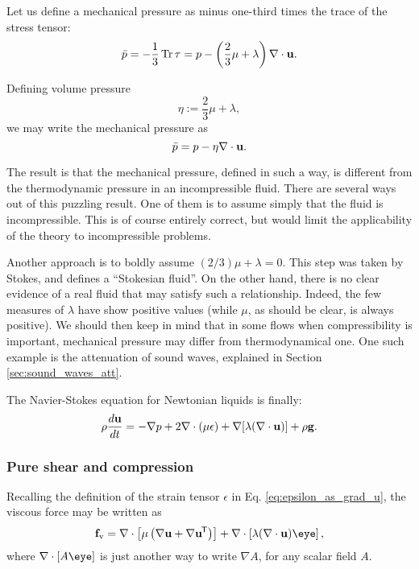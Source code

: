 Let us define a mechanical pressure as minus one-third times the trace
of the stress tensor:
\[
\bar{p}=
-\frac13 \operatorname{Tr} \tau  = 
 p
- \left( \frac23 \mu  + \lambda \right) \nabla\cdot \mathbf{u} .
\]

Defining volume pressure
\begin{equation}
  \label{eq:vol_visc_definition}
  \eta:=\frac23 \mu  + \lambda,
\end{equation}
we may write the mechanical pressure as
\[
  \bar{p}=
  p - \eta \nabla\cdot \mathbf{u} .
\]

The result is that the mechanical pressure, defined in such a way, is
different from the thermodynamic pressure in an incompressible fluid.
There are several ways out of this puzzling result. One of them is to
assume simply that the fluid is incompressible. This is of course
entirely correct, but would limit the applicability of the theory to
incompressible problems.

Another approach is to boldly assume $( 2/3 ) \mu+\lambda=0$. This
step was taken by Stokes, and defines a ``Stokesian fluid''. On the
other hand, there is no clear evidence of a real fluid that may
satisfy such a relationship. Indeed, the few measures of $\lambda$
have show positive values (while $\mu$, as should be clear, is always
positive). We should then keep in mind that in some flows when
compressibility is important, mechanical pressure may differ from
thermodynamical one. One such example is the attenuation of sound
waves, explained in Section \ref{sec:sound_waves_att}.

The Navier-Stokes equation for Newtonian liquids is finally:
\begin{equation}
  \label{eq:NS_Newtonian}
  \rho \frac{d\mathbf{u} }{dt} =
  - \nabla p +
  2 \nabla \cdot ( \mu \epsilon)
  + \nabla [ \lambda ( \nabla\cdot\mathbf{u} ) ]
  + \rho \mathbf{g} .
\end{equation}


\subsubsection{Pure shear and compression}

Recalling the definition of the strain tensor $\epsilon$
in Eq. \ref{eq:epsilon_as_grad_u}, the viscous force may be written as
\begin{equation*}
  \bff_\mathrm{v}=
  \nabla \cdot \left[ \mu  \left( \nabla\bfu + \nabla\bfu\tran \right) \right] +
  \nabla \cdot \left[ \lambda (\divu) \eye \right] ,
\end{equation*}
where $\nabla \cdot \left[ A \eye \right] $ is just another way to
write $\nabla A$, for any scalar field $A$.


